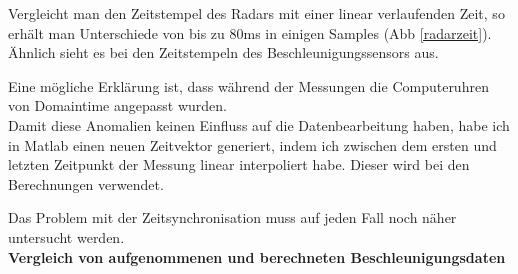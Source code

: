 \documentclass[12pt,a4paper,twoside,BCOR=12.5mm]{scrartcl}
\begin{document}
Vergleicht man den Zeitstempel des Radars mit einer linear verlaufenden Zeit, so erhält man Unterschiede von bis zu 80ms in einigen Samples (Abb \ref{radarzeit}). Ähnlich sieht es bei den Zeitstempeln des Beschleunigungssensors aus.

Eine mögliche Erklärung ist, dass während der Messungen die Computeruhren von Domaintime angepasst wurden.\\

Damit diese Anomalien keinen Einfluss auf die Datenbearbeitung haben, habe ich in Matlab einen neuen Zeitvektor generiert, indem ich zwischen dem ersten und letzten Zeitpunkt der Messung linear interpoliert habe. Dieser wird bei den Berechnungen verwendet.

Das Problem mit der Zeitsynchronisation muss auf jeden Fall noch näher untersucht werden.\\

\textbf{Vergleich von aufgenommenen und berechneten Beschleunigungsdaten}
\end{document}
